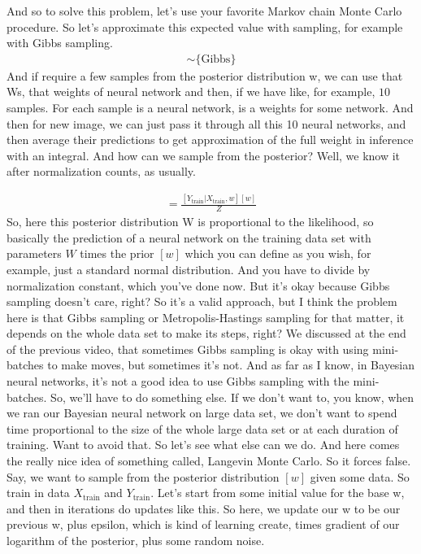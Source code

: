 \documentclass[11pt, oneside, reqno]{amsart}
\numberwithin{equation}{section}
\theoremstyle{plain}%
\theoremstyle{definition}
\theoremstyle{remark}
\begin{document}
 And so to solve this problem, let's use your favorite Markov chain Monte Carlo procedure. So let's approximate this expected value with sampling, for example with Gibbs sampling.
 \begin{align*} 	[w|Y_{\text{train}},X_{\text{train}}]\sim\{\text{Gibbs}\}
 \end{align*}
  And if require a few samples from the posterior distribution w, we can use that Ws, that weights of neural network and then, if we have like, for example, $10$ samples. For each sample is a neural network, is a weights for some network. And then for new image, we can just pass it through all this 10 neural networks, and then average their predictions to get approximation of the full weight in inference with an integral. And how can we sample from the posterior? Well, we know it after normalization counts, as usually. 
  
  \begin{align*}
  	[w|Y_{\text{train}},X_{\text{train}}]=
	\frac{[Y_{\text{train}}|X_{\text{train}},w][w]}{Z}
  \end{align*}
So, here this posterior distribution W is proportional to the likelihood, so basically the prediction of a neural network on the training data set with parameters $W$ times the prior $[w]$ which you can define as you wish, for example, just a standard normal distribution. And you have to divide by normalization constant, which you've done now. But it's okay because Gibbs sampling doesn't care, right? So it's a valid approach, but I think the problem here is that Gibbs sampling or Metropolis-Hastings sampling for that matter, it depends on the whole data set to make its steps, right? We discussed at the end of the previous video, that sometimes Gibbs sampling is okay with using mini-batches to make moves, but sometimes it's not. And as far as I know, in Bayesian neural networks, it's not a good idea to use Gibbs sampling with the mini-batches. So, we'll have to do something else. If we don't want to, you know, when we ran our Bayesian neural network on large data set, we don't want to spend time proportional to the size of the whole large data set or at each duration of training. Want to avoid that. So let's see what else can we do. And here comes the really nice idea of something called, Langevin Monte Carlo. So it forces false. Say, we want to sample from the posterior distribution $[w]$ given some data. So train in data $X_\text{train}$ and $Y_\text{train}$. Let's start from some initial value for the base w, and then in iterations do updates like this. So here, we update our w to be our previous w, plus epsilon, which is kind of learning create, times gradient of our logarithm of the posterior, plus some random noise. 
\end{document}
